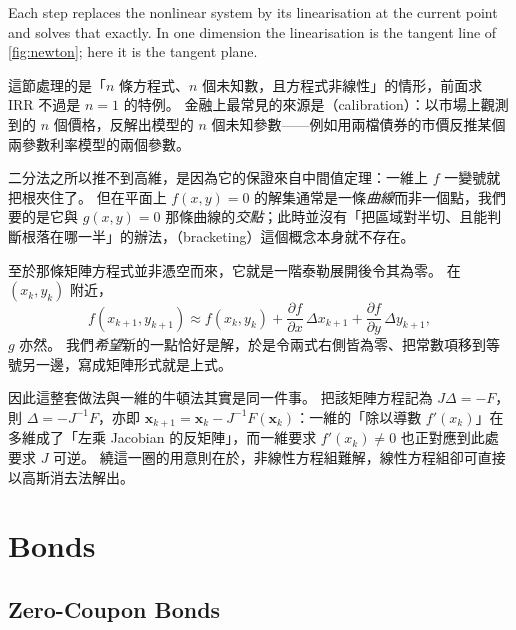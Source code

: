 \suppstart
\begin{intuition}
	Each step replaces the nonlinear system by its linearisation at the current point and solves that exactly.
	In one dimension the linearisation is the tangent line of \autoref{fig:newton}; here it is the tangent plane.
\end{intuition}

\begin{remark}
	這節處理的是「$n$ 條方程式、$n$ 個未知數，且方程式非線性」的情形，前面求 IRR 不過是 $n = 1$ 的特例。
	金融上最常見的來源是（calibration）：以市場上觀測到的 $n$ 個價格，反解出模型的 $n$ 個未知參數——例如用兩檔債券的市價反推某個兩參數利率模型的兩個參數。

	二分法之所以推不到高維，是因為它的保證來自中間值定理：一維上 $f$ 一變號就把根夾住了。
	但在平面上 $f(x,y) = 0$ 的解集通常是一條\emph{曲線}而非一個點，我們要的是它與 $g(x,y) = 0$ 那條曲線的\emph{交點}；此時並沒有「把區域對半切、且能判斷根落在哪一半」的辦法，（bracketing）這個概念本身就不存在。

	至於那條矩陣方程式並非憑空而來，它就是一階泰勒展開後令其為零。
	在 $(x_{k}, y_{k})$ 附近，
	\[
		f(x_{k+1}, y_{k+1}) \approx f(x_{k},y_{k})
		+ \frac{\partial f}{\partial x}\,\Delta x_{k+1}
		+ \frac{\partial f}{\partial y}\,\Delta y_{k+1} ,
	\]
	$g$ 亦然。
	我們\emph{希望}新的一點恰好是解，於是令兩式右側皆為零、把常數項移到等號另一邊，寫成矩陣形式就是上式。

	因此這整套做法與一維的牛頓法其實是同一件事。
	把該矩陣方程記為 $J\Delta = -F$，則 $\Delta = -J^{-1}F$，亦即 $\mathbf{x}_{k+1} = \mathbf{x}_{k} - J^{-1}F(\mathbf{x}_{k})$：一維的「除以導數 $f'(x_{k})$」在多維成了「左乘 Jacobian 的反矩陣」，而一維要求 $f'(x_{k}) \neq 0$ 也正對應到此處要求 $J$ 可逆。
	繞這一圈的用意則在於，非線性方程組難解，線性方程組卻可直接以高斯消去法解出。
\end{remark}
\suppend

\section{Bonds}


\subsection{Zero-Coupon Bonds}
\label{sec:zero-coupon}

